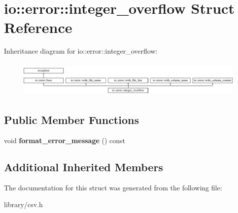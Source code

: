 \hypertarget{structio_1_1error_1_1integer__overflow}{}\section{io\+:\+:error\+:\+:integer\+\_\+overflow Struct Reference}
\label{structio_1_1error_1_1integer__overflow}
Inheritance diagram for io\+:\+:error\+:\+:integer\+\_\+overflow\+:\begin{figure}[H]
\begin{center}
\leavevmode
\includegraphics[height=1.787234cm]{structio_1_1error_1_1integer__overflow}
\end{center}
\end{figure}
\subsection*{Public Member Functions}
\begin{DoxyCompactItemize}
\item 
\mbox{\label{structio_1_1error_1_1integer__overflow_a25825600c3c29210160ba201519e6312}} 
void {\bfseries format\+\_\+error\+\_\+message} () const
\end{DoxyCompactItemize}
\subsection*{Additional Inherited Members}


The documentation for this struct was generated from the following file\+:\begin{DoxyCompactItemize}
\item 
library/csv.\+h\end{DoxyCompactItemize}

